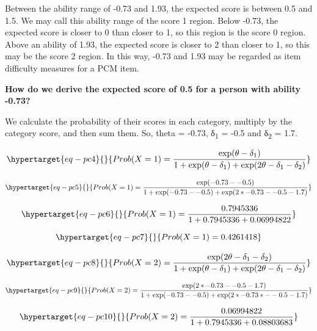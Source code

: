 \documentclass[
  letterpaper,
  DIV=11,
  numbers=noendperiod]{scrreprt}
\begin{document}
Between the ability range of -0.73 and 1.93, the expected score is
between 0.5 and 1.5. We may call this ability range of the score 1
region. Below -0.73, the expected score is closer to 0 than closer to 1,
so this region is the score 0 region. Above an ability of 1.93, the
expected score is closer to 2 than closer to 1, so this may be the score
2 region. In this way, -0.73 and 1.93 may be regarded as item difficulty
measures for a PCM item.

\textbf{How do we derive the expected score of 0.5 for a person with
ability -0.73?}

We calculate the probability of their scores in each category, multiply
by the category score, and then sum them. So, theta = -0.73,
δ\textsubscript{1} = -0.5 and δ\textsubscript{2} = 1.7.

\begin{equation}\protect\hypertarget{eq-pc4}{}{
Prob(X=1) = \frac{\exp(\theta - \delta_1)}{1+\exp(\theta - \delta_1) + \exp(2\theta - \delta_1 - \delta_2)}
}\label{eq-pc4}\end{equation}

\begin{equation}\protect\hypertarget{eq-pc5}{}{
Prob(X=1) = \frac{\exp(-0.73 - -0.5)}{1+\exp(-0.73 - -0.5) + \exp(2* -0.73 - -0.5 - 1.7)}
}\label{eq-pc5}\end{equation}

\begin{equation}\protect\hypertarget{eq-pc6}{}{
Prob(X=1) = \frac{0.7945336}{1+0.7945336 + 0.06994822}
}\label{eq-pc6}\end{equation}

\begin{equation}\protect\hypertarget{eq-pc7}{}{
Prob(X=1) = 0.4261418
}\label{eq-pc7}\end{equation}

\begin{equation}\protect\hypertarget{eq-pc8}{}{
Prob(X=2) = \frac{\exp(2\theta - \delta_1 - \delta_2)}{1+\exp(\theta - \delta_1) + \exp(2\theta - \delta_1 - \delta_2)}
}\label{eq-pc8}\end{equation}

\begin{equation}\protect\hypertarget{eq-pc9}{}{
Prob(X=2) = \frac{\exp(2*-0.73 - -0.5 - 1.7)}{1+\exp(-0.73 - -0.5) + \exp(2*-0.73 * - -0.5 - 1.7)}
}\label{eq-pc9}\end{equation}

\begin{equation}\protect\hypertarget{eq-pc10}{}{
Prob(X=2) = \frac{0.06994822}{1+0.7945336 + 0.08803683}
}\label{eq-pc10}\end{equation}
\end{document}

